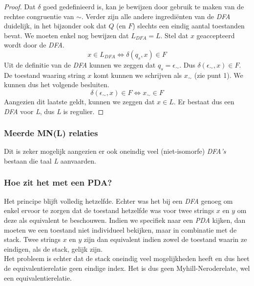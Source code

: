 \begin{proof}
  Dat $\delta$ goed gedefinieerd is, kan je bewijzen door gebruik te maken van de rechtse congruentie van $\sim$. Verder zijn alle andere ingredi\"enten van de \emph{DFA} duidelijk, in het bijzonder ook dat $Q$ (en $F$) slechts een eindig aantal toestanden bevat. We moeten enkel nog bewijzen dat $L_{DFA} = L$. Stel dat $x$ geaccepteerd wordt door de \emph{DFA}.
  $$x \in L_{DFA} \iff \delta(q_s, x) \in F$$
  Uit de definitie van de \emph{DFA} kunnen we zeggen dat $q_s = \epsilon_{\sim}$. Dus $\delta(\epsilon_{\sim},x) \in F$. De toestand waaring string $x$ komt kunnen we schrijven als $x_{\sim}$ (zie punt 1). We kunnen dus het volgende besluiten.
  $$\delta(\epsilon_{\sim},x) \in F \iff x_{\sim} \in F$$
  Aangezien dit laatste geldt, kunnen we zeggen dat $x \in L$. Er bestaat dus een \emph{DFA} voor \emph{L}, dus \emph{L} is regulier.
\end{proof}

\subsubsection*{Meerde MN(L) relaties}

Dit is zeker mogelijk aangezien er ook oneindig veel (niet-isomorfe) \emph{DFA's} bestaan die taal \emph{L} aanvaarden.

\subsubsection*{Hoe zit het met een PDA?}

Het principe blijft volledig hetzelfde. Echter was het bij een \emph{DFA} genoeg om enkel ervoor te zorgen dat de toestand hetzelfde was voor twee strings $x$ en $y$ om deze als equivalent te beschouwen. Indien we specifiek naar een \emph{PDA} kijken, dan moeten we een toestand niet individueel bekijken, maar in combinatie met de stack. Twee strings $x$ en $y$ zijn dan equivalent indien zowel de toestand waarin ze eindigen, als de stack, gelijk zijn.\\

Het probleem is echter dat de stack oneindig veel mogelijkheden heeft en dus heet de equivalentierelatie geen eindige index. Het is dus geen Myhill-Neroderelate, wel een equivalentierelatie.
